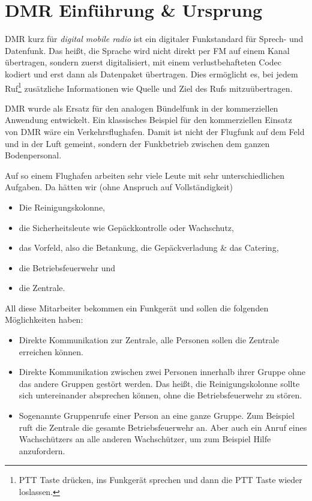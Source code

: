\section{DMR Einführung \& Ursprung} \label{sec:ursprung}
DMR kurz für \emph{digital mobile radio} ist ein digitaler Funkstandard für Sprech- und Datenfunk. Das heißt, die Sprache wird nicht direkt per FM  auf einem Kanal übertragen, sondern zuerst digitalisiert, mit einem verlustbehafteten Codec kodiert und erst dann als Datenpaket übertragen. Dies ermöglicht es, bei jedem Ruf\footnote{PTT Taste drücken, ins Funkgerät sprechen und dann die PTT Taste wieder loslassen.} zusätzliche Informationen wie Quelle und Ziel des Rufs mitzuübertragen.

DMR wurde als Ersatz für den analogen Bündelfunk in der kommerziellen Anwendung entwickelt. Ein klassisches Beispiel für den kommerziellen Einsatz von DMR wäre ein Verkehrsflughafen. Damit ist nicht der Flugfunk auf dem Feld und in der Luft gemeint, sondern der Funkbetrieb zwischen dem ganzen Bodenpersonal. 

Auf so einem Flughafen arbeiten sehr viele Leute mit sehr unterschiedlichen Aufgaben. Da hätten wir (ohne Anspruch auf Vollständigkeit)
\begin{itemize}
 \item Die Reinigungskolonne,
 \item die Sicherheitsleute wie Gepäckkontrolle oder Wachschutz,
 \item das Vorfeld, also die Betankung, die Gepäckverladung \& das Catering, 
 \item die Betriebsfeuerwehr und
 \item die Zentrale.
\end{itemize}

All diese Mitarbeiter bekommen ein Funkgerät und sollen die folgenden Möglichkeiten haben:
\begin{itemize}
 \item Direkte Kommunikation zur Zentrale, alle Personen sollen die Zentrale erreichen können.
 \item Direkte Kommunikation zwischen zwei Personen innerhalb ihrer Gruppe ohne das andere Gruppen gestört werden. Das heißt, die Reinigungskolonne sollte sich untereinander absprechen können, ohne die Betriebsfeuerwehr zu stören.
 \item Sogenannte Gruppenrufe einer Person an eine ganze Gruppe. Zum Beispiel ruft die Zentrale die gesamte Betriebsfeuerwehr an. Aber auch ein Anruf eines Wachschützers an alle anderen Wachschützer, um zum Beispiel Hilfe anzufordern. 
\end{itemize}
 
